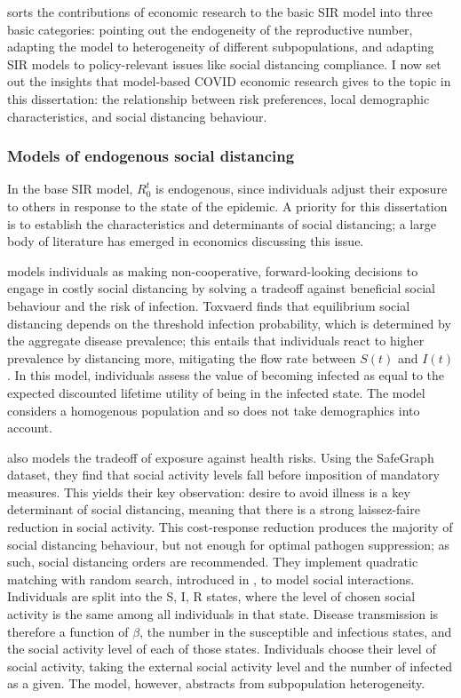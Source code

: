 \documentclass{article}
\begin{document}
\textcite{averyEconomistGuideEpidemiology2020} sorts the contributions of economic research to the basic SIR model into three basic categories: pointing out the endogeneity of the reproductive number, adapting the model to heterogeneity of different subpopulations, and adapting SIR models to policy-relevant issues like social distancing compliance. I now set out the insights that model-based COVID economic research gives to the topic in this dissertation: the relationship between risk preferences, local demographic characteristics, and social distancing behaviour.


\subsubsection{Models of endogenous social distancing}
In the base SIR model, \(R^t_0\) is endogenous, since individuals adjust their exposure to others in response to the state of the epidemic. A priority for this dissertation is to establish the characteristics and determinants of social distancing; a large body of literature has emerged in economics discussing this issue. 

\textcite{toxvaerdEquilibriumSocialDistancing2020} models individuals as making non-cooperative, forward-looking decisions to engage in costly social distancing by solving a tradeoff against beneficial social behaviour and the risk of infection. Toxvaerd finds that equilibrium social distancing depends on the threshold infection probability, which is determined by the aggregate disease prevalence; this entails that individuals react to higher prevalence by distancing more, mitigating the flow rate between \(S(t)\) and \(I(t)\). In this model, individuals assess the value of becoming infected as equal to the expected discounted lifetime utility of being in the infected state. The model considers a homogenous population and so does not take demographics into account.

\textcite{farboodiInternalExternalEffects2020} also models the tradeoff of exposure against health risks. Using the SafeGraph dataset, they find that social activity levels fall before imposition of mandatory measures. This yields their key observation: desire to avoid illness is a key determinant of social distancing, meaning that there is a strong laissez-faire reduction in social activity. This cost-response reduction produces the majority of social distancing behaviour, but not enough for optimal pathogen suppression; as such, social distancing orders are recommended. They implement quadratic matching with random search, introduced in \textcite{diamondEquilibriumAnalysisSearch1979}, to model social interactions. Individuals are split into the S, I, R states, where the level of chosen social activity is the same among all individuals in that state. Disease transmission is therefore a function of \(\beta\), the number in the susceptible and infectious states, and the social activity level of each of those states. Individuals choose their level of social activity, taking the external social activity level and the number of infected as a given. The model, however, abstracts from subpopulation heterogeneity.
\end{document}
